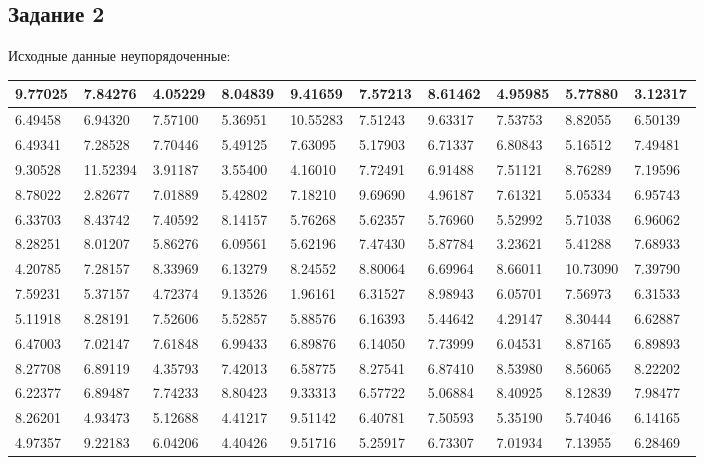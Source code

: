 \subsection{Задание 2}%
\label{subsec:2}%
Исходные данные неупорядоченные:\newline%
\newline%
%
\begin{changemargin}{-4cm}{0cm}\small{%
\begin{tabular}{|p{0.08\linewidth}|p{0.08\linewidth}|p{0.08\linewidth}|p{0.08\linewidth}|p{0.08\linewidth}|p{0.08\linewidth}|p{0.08\linewidth}|p{0.08\linewidth}|p{0.08\linewidth}|p{0.08\linewidth}|}%
\hline%
9.77025&7.84276&4.05229&8.04839&9.41659&7.57213&8.61462&4.95985&5.77880&3.12317\\%
\hline%
6.49458&6.94320&7.57100&5.36951&10.55283&7.51243&9.63317&7.53753&8.82055&6.50139\\%
\hline%
6.49341&7.28528&7.70446&5.49125&7.63095&5.17903&6.71337&6.80843&5.16512&7.49481\\%
\hline%
9.30528&11.52394&3.91187&3.55400&4.16010&7.72491&6.91488&7.51121&8.76289&7.19596\\%
\hline%
8.78022&2.82677&7.01889&5.42802&7.18210&9.69690&4.96187&7.61321&5.05334&6.95743\\%
\hline%
6.33703&8.43742&7.40592&8.14157&5.76268&5.62357&5.76960&5.52992&5.71038&6.96062\\%
\hline%
8.28251&8.01207&5.86276&6.09561&5.62196&7.47430&5.87784&3.23621&5.41288&7.68933\\%
\hline%
4.20785&7.28157&8.33969&6.13279&8.24552&8.80064&6.69964&8.66011&10.73090&7.39790\\%
\hline%
7.59231&5.37157&4.72374&9.13526&1.96161&6.31527&8.98943&6.05701&7.56973&6.31533\\%
\hline%
5.11918&8.28191&7.52606&5.52857&5.88576&6.16393&5.44642&4.29147&8.30444&6.62887\\%
\hline%
6.47003&7.02147&7.61848&6.99433&6.89876&6.14050&7.73999&6.04531&8.87165&6.89893\\%
\hline%
8.27708&6.89119&4.35793&7.42013&6.58775&8.27541&6.87410&8.53980&8.56065&8.22202\\%
\hline%
6.22377&6.89487&7.74233&8.80423&9.33313&6.57722&5.06884&8.40925&8.12839&7.98477\\%
\hline%
8.26201&4.93473&5.12688&4.41217&9.51142&6.40781&7.50593&5.35190&5.74046&6.14165\\%
\hline%
4.97357&9.22183&6.04206&4.40426&9.51716&5.25917&6.73307&7.01934&7.13955&6.28469\\%

\end{tabular}}
\end{changemargin}
